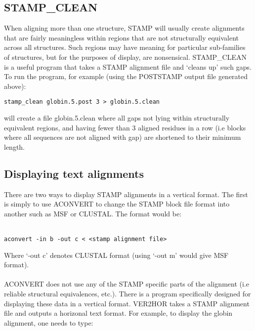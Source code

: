 \subsection{STAMP\_CLEAN}

When aligning more than one structure, STAMP will usually create 
alignments that are fairly meaningless within regions that are not 
structurally equivalent across all structures.  Such regions may have 
meaning for particular sub-families of structures, but for the purposes 
of display, are nonsensical.  STAMP\_CLEAN is a useful program that 
takes a STAMP alignment file and `cleans up' such gaps.  To run the
program, for example (using the POSTSTAMP output file generated above):\\

\begin{scriptsize}\begin{verbatim}
stamp_clean globin.5.post 3 > globin.5.clean
\end{verbatim} \end{scriptsize}

will create a file globin.5.clean where all gaps not lying within 
structurally equivalent regions, and having fewer than 3 aligned residues 
in a row (i.e blocks where all sequences are not aligned with gap) are 
shortened to their minimum length.

\subsection{Displaying text alignments}

There are two ways to display STAMP alignments in a vertical format.
The first is simply to use ACONVERT to change the STAMP block file format into
another such as MSF or CLUSTAL.  The format would be:\\
\\
\begin{scriptsize}\begin{verbatim}
aconvert -in b -out c < <stamp alignment file>
\end{verbatim} \end{scriptsize}

Where `-out c' denotes CLUSTAL format (using `-out m' would give MSF format).\\
\\
ACONVERT does not use any of the STAMP specific parts of the alignment (i.e reliable
structural equivalences, etc.).  There is a program specifically designed for displaying
these data in a vertical format.  VER2HOR takes a STAMP alignment file and outputs a 
horizonal text format.  For example, to display the globin alignment, one needs to
type:\\

